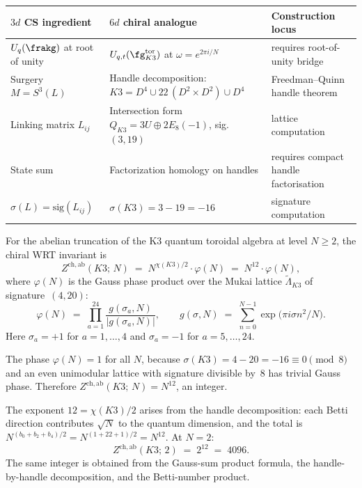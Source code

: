 \begin{center}
\renewcommand{\arraystretch}{1.3}
\small
\begin{tabular}{llp{5.5cm}}
 \toprule
 \textbf{$3d$ CS ingredient} & \textbf{$6d$ chiral analogue} & \textbf{Construction locus} \\
 \midrule
 $U_q(\frakg)$ at root of unity & $U_{q,t}(\fg_{K3}^{\mathrm{tor}})$ at $\omega = e^{2\pi i/N}$ & requires root-of-unity bridge \\
 Surgery $M = S^3(L)$ & Handle decomposition: $K3 = D^4 \cup 22\,(D^2 \times D^2) \cup D^4$ & Freedman--Quinn handle theorem \\
 Linking matrix $L_{ij}$ & Intersection form $Q_{K3} = 3U \oplus 2E_8(-1)$, sig.\,$(3, 19)$ & lattice computation \\
 State sum & Factorization homology on handles & requires compact handle factorisation \\
 $\sigma(L) = \mathrm{sig}(L_{ij})$ & $\sigma(K3) = 3 - 19 = -16$ & signature computation \\
 \bottomrule
\end{tabular}
\end{center}

\begin{conjecture}
\label{conj:chiral-wrt-k3}
\ClaimStatusConjectured
For the abelian truncation of the K3 quantum toroidal algebra at level $N \geq 2$, the chiral WRT invariant is
\begin{equation}\label{eq:chiral-wrt-k3}
 Z^{\mathrm{ch,ab}}(K3;\, N)
 \;=\; N^{\chi(K3)/2} \cdot \varphi(N)
 \;=\; N^{12} \cdot \varphi(N),
\end{equation}
where $\varphi(N)$ is the Gauss phase product over the Mukai lattice $\widetilde{\Lambda}_{K3}$ of signature~$(4, 20)$:
\[
 \varphi(N)
 \;=\; \prod_{a=1}^{24}
 \frac{g(\sigma_a, N)}{|g(\sigma_a, N)|},
 \qquad
 g(\sigma, N)
 \;=\; \sum_{n=0}^{N-1} \exp\!\bigl(\pi i \sigma n^2 / N\bigr).
\]
Here $\sigma_a = +1$ for $a = 1, \ldots, 4$ and $\sigma_a = -1$ for $a = 5, \ldots, 24$.

The phase $\varphi(N) = 1$ for all $N$, because $\sigma(K3) = 4 - 20 = -16 \equiv 0 \pmod{8}$ and an even unimodular lattice with signature divisible by~$8$ has trivial Gauss phase. Therefore $Z^{\mathrm{ch,ab}}(K3;\, N) = N^{12}$, an integer.
\end{conjecture}

The exponent $12 = \chi(K3)/2$ arises from the handle decomposition: each Betti direction contributes $\sqrt{N}$ to the quantum dimension, and the total is $N^{(b_0 + b_2 + b_4)/2} = N^{(1 + 22 + 1)/2} = N^{12}$. At $N = 2$:
\[
 Z^{\mathrm{ch,ab}}(K3;\, 2) \;=\; 2^{12} \;=\; 4096.
\]
The same integer is obtained from the Gauss-sum product formula, the
handle-by-handle decomposition, and the Betti-number product.

